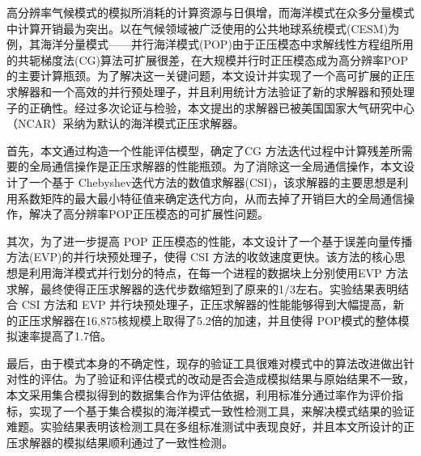 \begin{cabstract}
  高分辨率气候模式的模拟所消耗的计算资源与日俱增，而海洋模式在众多分量模式中计算开销最为突出。以在气候领域被广泛使用的公共地球系统模式(CESM)为例，其海洋分量模式——并行海洋模式(POP)由于正压模态中求解线性方程组所用的共轭梯度法(CG)算法可扩展很差，在大规模并行时正压模态成为高分辨率POP的主要计算瓶颈。为了解决这一关键问题，本文设计并实现了一个高可扩展的正压求解器和一个高效的并行预处理子，并且利用统计方法验证了新的求解器和预处理子的正确性。经过多次论证与检验，本文提出的求解器已被美国国家大气研究中心（NCAR）采纳为默认的海洋模式正压求解器。

  首先，本文通过构造一个性能评估模型，确定了CG 方法迭代过程中计算残差所需要的全局通信操作是正压求解器的性能瓶颈。为了消除这一全局通信操作，本文设计了一个基于 Chebyshev迭代方法的数值求解器(CSI)，该求解器的主要思想是利用系数矩阵的最大最小特征值来确定迭代方向，从而去掉了开销巨大的全局通信操作，解决了高分辨率POP正压模态的可扩展性问题。

  其次，为了进一步提高 POP 正压模态的性能，本文设计了一个基于误差向量传播方法(EVP)的并行块预处理子，使得 CSI 方法的收敛速度更快。该方法的核心思想是利用海洋模式并行划分的特点，在每一个进程的数据块上分别使用EVP 方法求解，最终使得正压求解器的迭代步数缩短到了原来的1/3左右。实验结果表明结合 CSI 方法和 EVP 并行块预处理子，正压求解器的性能能够得到大幅提高，新的正压求解器在16,875核规模上取得了5.2倍的加速，并且使得 POP模式的整体模拟速率提高了1.7倍。

  最后，由于模式本身的不确定性，现存的验证工具很难对模式中的算法改进做出针对性的评估。为了验证和评估模式的改动是否会造成模拟结果与原始结果不一致，本文采用集合模拟得到的数据集合作为评估依据，利用标准分通过率作为评价指标，实现了一个基于集合模拟的海洋模式一致性检测工具，来解决模式结果的验证难题。实验结果表明该检测工具在多组标准测试中表现良好，并且本文所设计的正压求解器的模拟结果顺利通过了一致性检测。

\end{cabstract}


